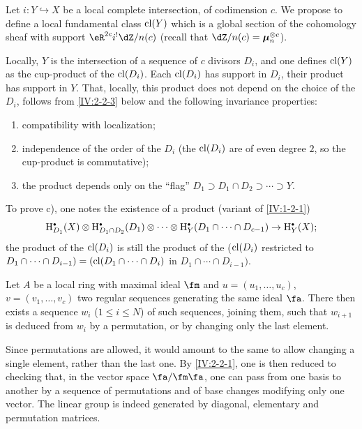 \subsubsection{}\label{IV:2-2-2}

Let $i:Y\hookrightarrow X$ be a local complete intersection, of codimension
$c$. We propose to define a local fundamental class
$\operatorname{cl}(Y)$ which is a global section of the cohomology sheaf with support
$\eR^{2c}i^! \dZ/n(c)$ (recall that $\dZ/n(c)=\dmu_n^{\otimes c}$).

Locally, $Y$ is the intersection of a sequence of $c$ divisors $D_i$, and one
defines $\operatorname{cl}(Y)$ as the cup-product of the $\operatorname{cl}(D_i)$. Each $\operatorname{cl}(D_i)$ has
support in $D_i$, their product has support in $Y$. That, locally,
this product does not depend on the choice of the $D_i$, follows from \ref{IV:2-2-3}
below and the following invariance properties:
\begin{enumerate}[\indent a)]
  \item compatibility with localization;
  \item independence of the order of the $D_i$ (the $\operatorname{cl}(D_i)$ are of even
    degree $2$, so the cup-product is commutative);
  \item the product depends only on the ``flag''
    $D_1\supset D_1\cap D_2\supset \cdots\supset Y$.
\end{enumerate}
To prove c), one notes the existence of a product (variant of \ref{IV:1-2-1})
\[
  \h_{D_1}^\bullet(X)\otimes \h_{D_1\cap D_2}^\bullet(D_1)\otimes \cdots \otimes \h_Y^\bullet(D_1\cap \cdots \cap D_{c-1}) \to \h_Y^\bullet(X) \text{;}
\]
the product of the $\operatorname{cl}(D_i)$ is still the product of the ($\operatorname{cl}(D_i)$ restricted to
$D_1\cap \cdots \cap D_{i-1})=(\operatorname{cl}(D_1\cap \cdots \cap D_i)$ in
$D_1\cap \cdots \cap D_{i-1})$.




\begin{lemma}\label{IV:2-2-3}
Let $A$ be a local ring with maximal ideal $\fm$ and $u=(u_1,\dots,u_c)$,
$v=(v_1,\dots,v_c)$ two regular sequences generating the same ideal
$\fa$. There then exists a sequence $w_i$ ($1\leqslant i\leqslant N$) of such
sequences, joining them, such that $w_{i+1}$ is deduced from $w_i$ by a
permutation, or by changing only the last element.
\end{lemma}

Since permutations are allowed, it would amount to the same to allow
changing a single element, rather than the last one. By \ref{IV:2-2-1}, one is
then reduced to checking that, in the vector space $\fa/\fm\fa$, one
can pass from one basis to another by a sequence of permutations and of
base changes modifying only one vector. The linear group is
indeed generated by diagonal, elementary and
permutation matrices.




